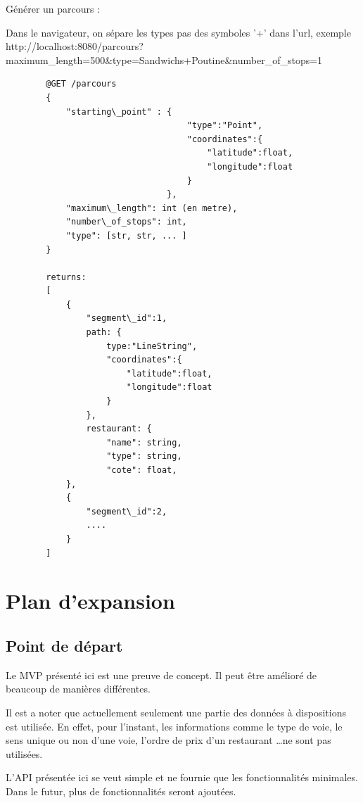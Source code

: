 \documentclass[12pt]{article}
\begin{document}
    Générer un parcours :
    
    Dans le navigateur, on sépare les types pas des symboles '+' dans l'url, exemple http://localhost:8080/parcours?maximum\_length=500\&type=Sandwichs+Poutine\&number\_of\_stops=1
        
    \begin{lstlisting}
        @GET /parcours
        {
            "starting\_point" : {
                                    "type":"Point", 
                                    "coordinates":{
                                        "latitude":float, 
                                        "longitude":float
                                    }
                                },
            "maximum\_length": int (en metre),
            "number\_of_stops": int,
            "type": [str, str, ... ]
        }

        returns:
        [
            {
                "segment\_id":1,
                path: {
                    type:"LineString", 
                    "coordinates":{
                        "latitude":float, 
                        "longitude":float
                    }
                },
                restaurant: {
                    "name": string,
                    "type": string,
                    "cote": float,
            },
            {
                "segment\_id":2,
                ....   
            }
        ]
    \end{lstlisting}
    
\section{Plan d'expansion}

\subsection{Point de départ}

    Le MVP présenté ici est une preuve de concept. Il peut être amélioré de beaucoup de manières différentes.

    Il est a noter que actuellement seulement une partie des données à dispositions est utilisée. En effet, pour l'instant, les informations comme le type de voie, le sens unique ou non d'une voie, l'ordre de prix d'un restaurant \dots ne sont pas utilisées.

    L'API présentée ici se veut simple et ne fournie que les fonctionnalités minimales. Dans le futur, plus de fonctionnalités seront ajoutées.
\end{document}

